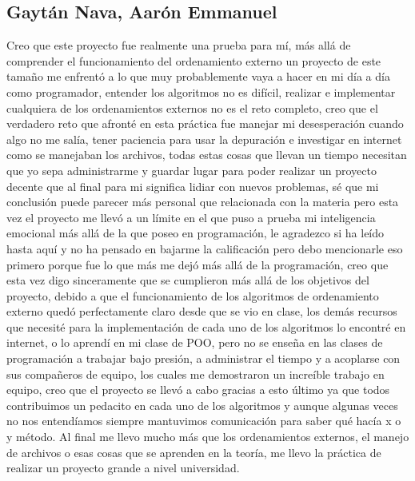 \documentclass[11pt]{article}
\begin{document}
\subsection{Gaytán Nava, Aarón Emmanuel}
\par
Creo que este proyecto fue realmente una prueba para mí, más allá de comprender el funcionamiento del ordenamiento externo un proyecto de este tamaño me enfrentó a lo que muy probablemente vaya a hacer en mi día a día como programador, entender los algoritmos no es difícil, realizar e implementar cualquiera de los ordenamientos externos no es el reto completo, creo que el verdadero reto que afronté en esta práctica fue manejar mi desesperación cuando algo no me salía, tener paciencia para usar la depuración e investigar en internet como se manejaban los archivos, todas estas cosas que llevan un tiempo necesitan que yo sepa administrarme y guardar lugar para poder realizar un proyecto decente que al final para mi significa lidiar con nuevos problemas, sé que mi conclusión puede parecer más personal que relacionada con la materia pero esta vez el proyecto me llevó a un límite en el que puso a prueba mi inteligencia emocional más allá de la que poseo en programación, le agradezco si ha leído hasta aquí y no ha pensado en bajarme la calificación pero debo mencionarle eso primero porque fue lo que más me dejó más allá de la programación, creo que esta vez digo sinceramente que se cumplieron más allá de los objetivos del proyecto, debido a que el funcionamiento de los algoritmos de ordenamiento externo quedó perfectamente claro desde que se vio en clase, los demás recursos que necesité para la implementación de cada uno de los algoritmos lo encontré en internet, o lo aprendí en mi clase de POO, pero no se enseña en las clases de programación a trabajar bajo presión, a administrar el tiempo y a acoplarse con sus compañeros de equipo, los cuales me demostraron un increíble trabajo en equipo, creo que el proyecto se llevó a cabo gracias a esto último ya que todos contribuimos un pedacito en cada uno de los algoritmos y aunque algunas veces no nos entendíamos siempre mantuvimos comunicación para saber qué hacía x o y método. Al final me llevo mucho más que los ordenamientos externos, el manejo de archivos o esas cosas que se aprenden en la teoría, me llevo la práctica de realizar un proyecto grande a nivel universidad.
\end{document}
